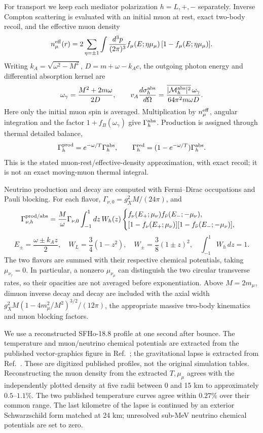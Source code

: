 \documentclass[12pt,a4paper]{article}
\begin{document}
For transport we keep each mediator polarization \(h=L,+,-\) separately. Inverse Compton scattering is evaluated with an initial muon at rest, exact two-body recoil, and the effective muon density
\[
n_\mu^{\rm eff}(r)=2\sum_{\eta=\pm1}
\int\frac{d^3p}{(2\pi)^3}
f_\mu(E;\eta\mu_\mu)\,[1-f_\mu(E;\eta\mu_\mu)].
\]
Writing \(k_A=\sqrt{\omega^2-M^2}\), \(D=m+\omega-k_Ac\), the outgoing photon energy and differential absorption kernel are
\[
\omega_\gamma=\frac{M^2+2m\omega}{2D},\qquad
v_A\frac{d\sigma_h^{\rm abs}}{d\Omega}
=\frac{\overline{|\mathcal M_h^{\rm abs}|^2}\,\omega_\gamma}
{64\pi^2m\omega D}.
\]
Here only the initial muon spin is averaged. Multiplication by \(n_\mu^{\rm eff}\), angular integration and the factor \(1+f_B(\omega_\gamma)\) give \(\Gamma_h^{\rm abs}\). Production is assigned through thermal detailed balance,
\[
\Gamma_h^{\rm prod}=e^{-\omega/T}\Gamma_h^{\rm abs},\qquad
\Gamma_h^{\rm red}=(1-e^{-\omega/T})\Gamma_h^{\rm abs}.
\]
This is the stated muon-rest/effective-density approximation, with exact recoil; it is not an exact moving-muon thermal integral.

Neutrino production and decay are computed with Fermi--Dirac occupations and Pauli blocking. For each flavor, \(\Gamma_{\nu,0}=g_X^2M/(24\pi)\), and
\[
\Gamma_{\nu,h}^{\rm prod/abs}
=\frac{M}{\omega}\Gamma_{\nu,0}\int_{-1}^{1}dz\,W_h(z)
\begin{cases}
f_\nu(E_+;\mu_\nu)f_{\bar\nu}(E_-;-\mu_\nu),\\
[1-f_\nu(E_+;\mu_\nu)][1-f_{\bar\nu}(E_-;-\mu_\nu)],
\end{cases}
\]
\[
E_\pm=\frac{\omega\pm k_Az}{2},\quad
W_L=\frac34(1-z^2),\quad W_\pm=\frac38(1\pm z)^2,\quad
\int_{-1}^{1}W_h\,dz=1.
\]
The two flavors are summed with their respective chemical potentials, taking \(\mu_{\nu_\tau}=0\). In particular, a nonzero \(\mu_{\nu_\mu}\) can distinguish the two circular transverse rates, so their opacities are not averaged before exponentiation. Above \(M=2m_\mu\), dimuon inverse decay and decay are included with the axial width \(g_X^2M(1-4m_\mu^2/M^2)^{3/2}/(12\pi)\), the appropriate massive two-body kinematics and muon blocking factors.

We use a reconstructed SFHo-18.8 profile at one second after bounce. The temperature and muon/neutrino chemical potentials are extracted from the published vector-graphics figure in Ref.~\cite{Caputo:2021rux}; the gravitational lapse is extracted from Ref.~\cite{Ferreira:2025muonALP}. These are digitized published profiles, not the original simulation tables. Reconstructing the muon density from the extracted \(T,\mu_\mu\) agrees with the independently plotted density at five radii between 0 and 15 km to approximately \(0.5\)--\(1.1\%\). The two published temperature curves agree within \(0.27\%\) over their common range. The last kilometre of the lapse is continued by an exterior Schwarzschild form matched at 24 km; unresolved sub-MeV neutrino chemical potentials are set to zero.
\end{document}
